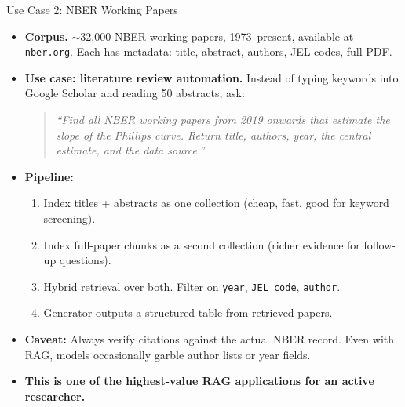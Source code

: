 \begin{frame}{Use Case 2: NBER Working Papers}
\begin{itemize}
\item \textbf{Corpus.} $\sim$32{,}000 NBER working papers, 1973--present, available at \texttt{nber.org}. Each has metadata: title, abstract, authors, JEL codes, full PDF.

\medskip
\item \textbf{Use case: literature review automation.} Instead of typing keywords into Google Scholar and reading 50 abstracts, ask:
\begin{quote}
\small\itshape
``Find all NBER working papers from 2019 onwards that estimate the slope of the Phillips curve. Return title, authors, year, the central estimate, and the data source.''
\end{quote}

\medskip
\item \textbf{Pipeline:}
\begin{enumerate}
    \item Index titles + abstracts as one collection (cheap, fast, good for keyword screening).
    \item Index full-paper chunks as a second collection (richer evidence for follow-up questions).
    \item Hybrid retrieval over both. Filter on \texttt{year}, \texttt{JEL\_code}, \texttt{author}.
    \item Generator outputs a structured table from retrieved papers.
\end{enumerate}

\medskip
\item \textbf{Caveat:} Always verify citations against the actual NBER record. Even with RAG, models occasionally garble author lists or year fields.

\medskip
\item \textbf{This is one of the highest-value RAG applications for an active researcher.}
\end{itemize}
\end{frame}

